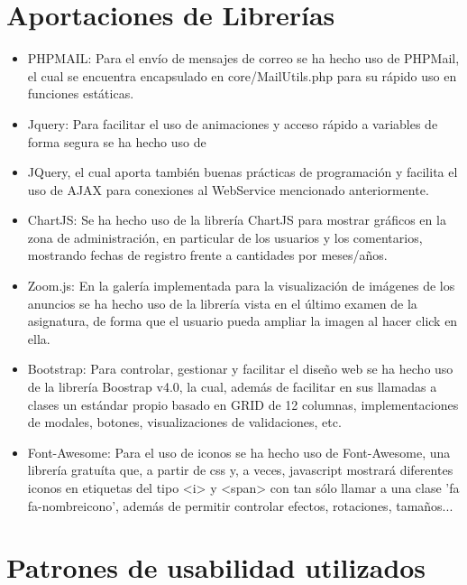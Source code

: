 \section{Aportaciones de Librer\'{i}as}
\begin{itemize}


\item PHPMAIL: Para el env\'{i}o de mensajes de correo se ha hecho uso de PHPMail, el cual se encuentra encapsulado en core/MailUtils.php para su r\'{a}pido uso 
en funciones est\'{a}ticas.

\item Jquery: Para facilitar el uso de animaciones y acceso r\'{a}pido a variables de forma segura se ha hecho uso de 
\item JQuery, el cual aporta tambi\'{e}n buenas pr\'{a}cticas de programaci\'{o}n y facilita el uso de AJAX para conexiones al WebService 
mencionado anteriormente.

\item ChartJS: Se ha hecho uso de la librer\'{i}a ChartJS para mostrar gr\'{a}ficos en la zona de administraci\'{o}n, en particular de los usuarios
y los comentarios, mostrando fechas de registro frente a cantidades por meses/a\~{n}os.

\item Zoom.js: En la galer\'{i}a implementada para la visualizaci\'{o}n de im\'{a}genes de los anuncios se ha hecho uso de la librer\'{i}a
vista en el \'{u}ltimo examen de la asignatura, de forma que el usuario pueda ampliar la imagen al hacer click en ella.

\item Bootstrap: Para controlar, gestionar y facilitar el dise\~{n}o web se ha hecho uso de la librer\'{i}a Boostrap v4.0, la cual, adem\'{a}s de facilitar en sus
llamadas a clases un est\'{a}ndar propio basado en GRID de 12 columnas, implementaciones de modales, botones, visualizaciones de validaciones, etc.

\item Font-Awesome: Para el uso de iconos se ha hecho uso de Font-Awesome, una librer\'{i}a gratu\'{i}ta que, a partir de css y, a veces, javascript
mostrar\'{a} diferentes iconos en etiquetas del tipo <i> y <span> con tan s\'{o}lo llamar a una clase 'fa fa-nombreicono', adem\'{a}s
de permitir controlar efectos, rotaciones, tama\~{n}os...
\end{itemize}

\section{Patrones de usabilidad utilizados}

